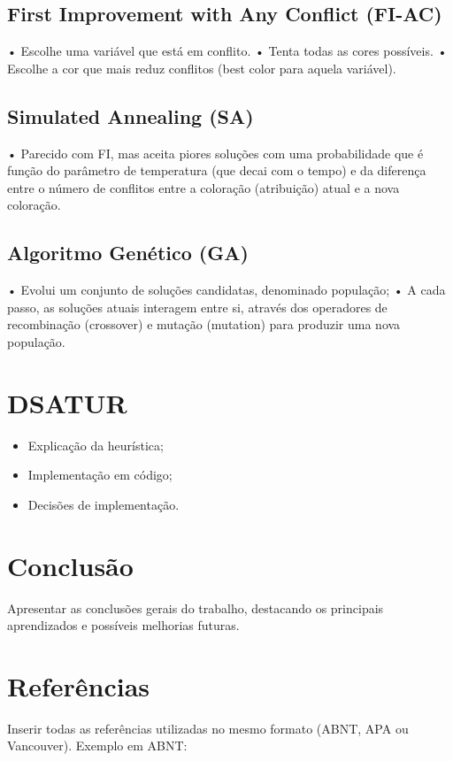 \documentclass[12pt,a4paper]{article}
\begin{document}
\subsection{First Improvement with Any Conflict (FI-AC)}
• Escolhe uma variável que está em conflito.
• Tenta todas as cores possíveis.
• Escolhe a cor que mais reduz conflitos (best color para aquela variável).

\subsection{Simulated Annealing (SA)}
• Parecido com FI, mas aceita piores soluções com uma probabilidade que é
função do parâmetro de temperatura (que decai com o tempo) e da diferença
entre o número de conflitos entre a coloração (atribuição) atual e a nova
coloração.

\subsection{Algoritmo Genético (GA)}
• Evolui um conjunto de soluções candidatas, denominado população;
• A cada passo, as soluções atuais interagem entre si, através dos operadores
de recombinação (crossover) e mutação (mutation) para produzir uma nova
população.

\section{DSATUR}
\begin{itemize}
\item Explicação da heurística;
\item Implementação em código;
\item Decisões de implementação.
\end{itemize}


\section{Conclusão}
Apresentar as conclusões gerais do trabalho, destacando os principais aprendizados e possíveis melhorias futuras.

\section*{Referências}

Inserir todas as referências utilizadas no mesmo formato (ABNT, APA ou Vancouver).  
Exemplo em ABNT:

\end{document}
